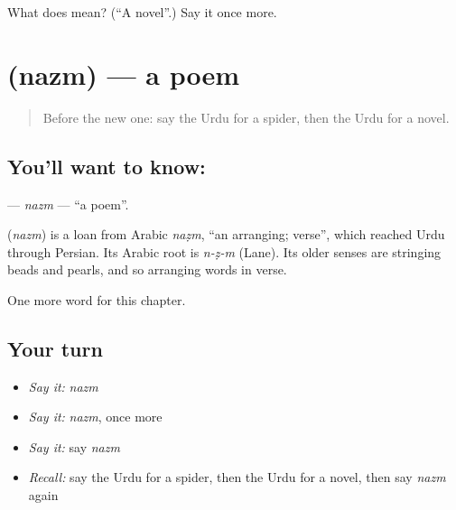 \begin{tcolorbox}[breakable,colback=teal!4,colframe=teal!35!black,title={Before you move on}]
What does  mean? (\textquotedblleft{}A novel\textquotedblright{}.) Say it once more.
\end{tcolorbox}
\section[\texorpdfstring{\ur{نظم} (nazm)}{نظم (nazm)}]{ (nazm) — a poem}

\label{lesson:UR-C254-nazm}



\begin{quote}
Before the new one: say the Urdu for a spider, then the Urdu for a novel.
\end{quote}

\subsection*{You'll want to know: }
\textbf{} — \emph{nazm} — \textquotedblleft{}a poem\textquotedblright{}.

\begin{cousinweb}
\textbf{} (\emph{nazm}) is a loan from Arabic \emph{naẓm}, \textquotedblleft{}an arranging; verse\textquotedblright{}, which reached Urdu through Persian. Its Arabic root is \emph{n-ẓ-m} (Lane). Its older senses are stringing beads and pearls, and so arranging words in verse.
\end{cousinweb}

\begin{grammarlens}[title={What you've built}]
One more word for this chapter.
\end{grammarlens}

\subsection*{Your turn}
\begin{itemize}
\raggedright
  \item \emph{Say it:} \emph{nazm}
  \item \emph{Say it:} \emph{nazm}, once more
  \item \emph{Say it:} say \emph{nazm}
  \item \emph{Recall:} say the Urdu for a spider, then the Urdu for a novel, then say \emph{nazm} again
\end{itemize}

